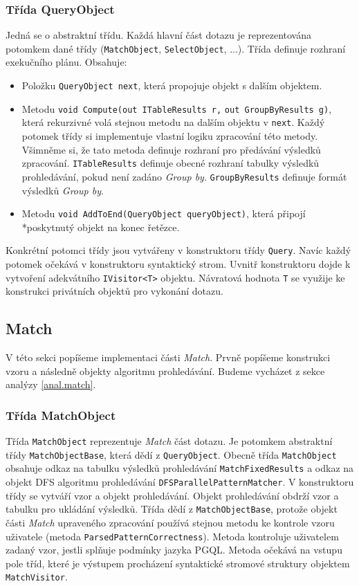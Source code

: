 \subsubsection{Třída QueryObject}

Jedná se o abstraktní třídu.
Každá hlavní část dotazu je reprezentována potomkem dané třídy (\texttt{MatchObject}, \texttt{SelectObject}, ...).
Třída definuje rozhraní exekučního plánu.
Obsahuje:
\begin{itemize}
\item Položku \texttt{QueryObject next}, která propojuje objekt s dalším objektem.
\item Metodu \texttt{void Compute(out ITableResults r,} \texttt{out GroupByResults g)}, která rekurzivné volá stejnou metodu na dalším objektu v \texttt{next}.
Každý potomek třídy si implementuje vlastní logiku zpracování této metody.
Všimněme si, že tato metoda definuje rozhraní pro předávání výsledků zpracování.
\texttt{ITableResults} definuje obecné rozhraní tabulky výsledků prohledávání, pokud není zadáno \textit{Group by}.
\texttt{GroupByResults} definuje formát výsledků \textit{Group by}.
\item Metodu \texttt{void AddToEnd(QueryObject queryObject)}, která připojí \\*poskytnutý objekt na konec řetězce.
\end{itemize}
Konkrétní potomci třídy jsou vytvářeny v konstruktoru třídy \texttt{Query}.
Navíc každý potomek očekává v konstruktoru syntaktický strom.
Uvnitř konstruktoru dojde k vytvoření adekvátního \texttt{IVisitor<T>} objektu.
Návratová hodnota \texttt{T} se využije ke konstrukci privátních objektů pro vykonání dotazu.

\subsection{Match} \label{impl.match}

V této sekci popíšeme implementaci části \textit{Match}.
Prvně popíšeme konstrukci vzoru a následně objekty algoritmu prohledávání.
Budeme vycházet z sekce analýzy \ref{anal.match}.

\subsubsection{Třída MatchObject}

Třída \texttt{MatchObject} reprezentuje \textit{Match} část dotazu.
Je potomkem abstraktní třídy \texttt{MatchObjectBase}, která dědí z \texttt{QueryObject}.
Obecně třída \texttt{MatchObject} obsahuje odkaz na tabulku výsledků prohledávání \texttt{MatchFixedResults} a odkaz na objekt DFS algoritmu prohledávání \texttt{DFSParallelPatternMatcher}.
V konstruktoru třídy se vytváří vzor a objekt prohledávání.
Objekt prohledávání obdrží vzor a tabulku pro ukládání výsledků.
Třída dědí z \texttt{MatchObjectBase}, protože objekt části \textit{Match} upraveného zpracování používá stejnou metodu ke kontrole vzoru uživatele (metoda \texttt{ParsedPatternCorrectness}).
Metoda kontroluje uživatelem zadaný vzor, jestli splňuje podmínky jazyka PGQL. 
Metoda očekává na vstupu pole tříd, které je výstupem procházení syntaktické stromové struktury objektem \texttt{MatchVisitor}. 

